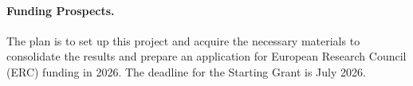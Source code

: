 \documentclass[11pt, a4paper]{article}
\begin{document}

\paragraph{Funding Prospects.}The plan is to set up this project and acquire 
the necessary materials to consolidate the results and prepare an application for 
European Research Council (ERC) funding in 2026. The deadline for the Starting Grant is July 2026.






\end{document}
